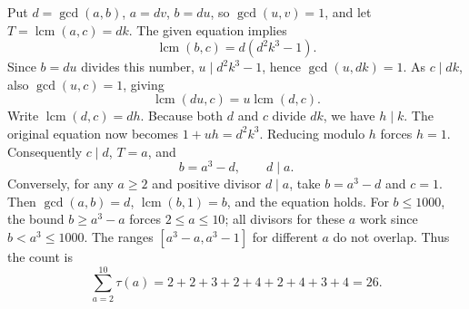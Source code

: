 Put $d=\gcd(a,b)$, $a=dv$, $b=du$, so $\gcd(u,v)=1$, and let $T=\operatorname{lcm}(a,c)=dk$. The given equation implies
\[
\operatorname{lcm}(b,c)=d(d^2k^3-1).
\]
Since $b=du$ divides this number, $u\mid d^2k^3-1$, hence $\gcd(u,dk)=1$. As $c\mid dk$, also $\gcd(u,c)=1$, giving
\[
\operatorname{lcm}(du,c)=u\operatorname{lcm}(d,c).
\]
Write $\operatorname{lcm}(d,c)=dh$. Because both $d$ and $c$ divide $dk$, we have $h\mid k$. The original equation now becomes $1+uh=d^2k^3$. Reducing modulo $h$ forces $h=1$. Consequently $c\mid d$, $T=a$, and
\[
b=a^3-d,\qquad d\mid a.
\]
Conversely, for any $a\ge2$ and positive divisor $d\mid a$, take $b=a^3-d$ and $c=1$. Then $\gcd(a,b)=d$, $\operatorname{lcm}(b,1)=b$, and the equation holds.
For $b\le1000$, the bound $b\ge a^3-a$ forces $2\le a\le10$; all divisors for these $a$ work since $b<a^3\le1000$. The ranges $[a^3-a,a^3-1]$ for different $a$ do not overlap. Thus the count is
\[
\sum_{a=2}^{10}\tau(a)=2+2+3+2+4+2+4+3+4=\boxed{26}.
\]
